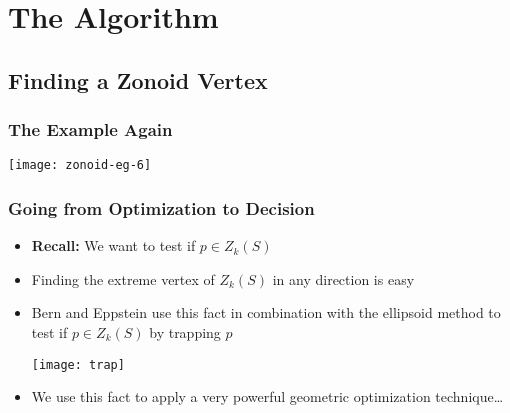 \documentclass{beamer}
\begin{document}
\section{The Algorithm}

\subsection{Finding a Zonoid Vertex}


\frame
{
   \frametitle{The Example Again}
   \begin{center}
    \texttt{[image: zonoid-eg-6]}
   \end{center}
}



\frame
{
   \frametitle{Going from Optimization to Decision}
 \begin{itemize}
   \item<1->\textbf{Recall:} We want to test if $p\in Z_k(S)$
   \item<1->Finding the extreme vertex of $Z_k(S)$ in any direction
	is easy
   \item<2->Bern and Eppstein use this fact in combination with the 
	ellipsoid method to test if 
	$p\in Z_k(S)$ by trapping $p$
	\begin{center}\texttt{[image: trap]}\end{center}
   \item<3-> We use this fact to apply a very powerful
	geometric optimization technique\ldots
  \end{itemize}
}
\end{document}
